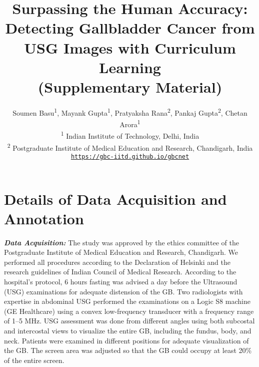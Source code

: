 \documentclass[10pt,twocolumn,letterpaper]{article}
\newcommand{\myfirstpara}[1]{\noindent \textbf{\textit{#1:}}}
\newcommand{\beginsupplement}{%
        \setcounter{table}{0}
        \renewcommand{\thetable}{S\arabic{table}}%
        \setcounter{figure}{0}
        \renewcommand{\thefigure}{S\arabic{figure}}%
     }
\begin{document}
\title{Surpassing the Human Accuracy: \\ Detecting Gallbladder Cancer from USG Images with Curriculum Learning \\ (Supplementary Material)}

\author{Soumen Basu\textsuperscript{1}, Mayank Gupta\textsuperscript{1}, Pratyaksha Rana\textsuperscript{2}, Pankaj Gupta\textsuperscript{2}, Chetan Arora\textsuperscript{1} \\
\textsuperscript{1} Indian Institute of Technology, Delhi, India \\ 
\textsuperscript{2} Postgraduate Institute of Medical Education and Research, Chandigarh, India\\
{\tt\small \href{https://gbc-iitd.github.io/gbcnet}{https://gbc-iitd.github.io/gbcnet}}
}

\maketitle

\appendix
\beginsupplement

\section{Details of Data Acquisition and Annotation}
\label{supp:data_collection}
\myfirstpara{Data Acquisition} The study was approved by the ethics committee of the Postgraduate Institute of Medical Education and Research, Chandigarh. We performed all procedures according to the Declaration of Helsinki and the research guidelines of Indian Council of Medical Research. According to the hospital's protocol, 6 hours fasting was advised a day before the Ultrasound (USG) examinations for adequate distension of the GB. Two radiologists with expertise in abdominal USG performed the examinations on a Logic S8 machine (GE Healthcare) using a convex low-frequency transducer with a frequency range of 1--5 MHz.  USG assessment was done from different angles using both subcostal and intercostal views to visualize the entire GB, including the fundus, body, and neck.  Patients were examined in different positions for adequate visualization of the GB.  The screen area was adjusted so that the GB could occupy at least 20\% of the entire screen.  
\end{document}
